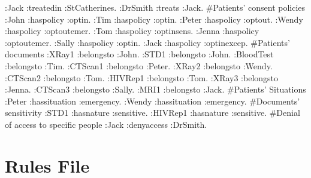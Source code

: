 \documentclass[conference]{IEEEtran}
\begin{document}
:Jack :treatedin :StCatherines.\newline
:DrSmith :treats :Jack.\newline
\newline
\#Patients' consent policies\newline
:John :haspolicy :optin.\newline
:Tim :haspolicy :optin.\newline
:Peter :haspolicy :optout.\newline
:Wendy :haspolicy :optoutemer.\newline
:Tom :haspolicy :optinsens.\newline
:Jenna :haspolicy :optoutemer.\newline
:Sally :haspolicy :optin.\newline
:Jack :haspolicy :optinexcep.\newline
\newline
\#Patients' documents\newline
:XRay1 :belongsto :John.\newline
:STD1 :belongsto :John.\newline
:BloodTest :belongsto :Tim.\newline
:CTScan1 :belongsto :Peter.\newline
:XRay2 :belongsto :Wendy.\newline
:CTScan2 :belongsto :Tom.\newline
:HIVRep1 :belongsto :Tom.\newline
:XRay3 :belongsto :Jenna.\newline
:CTScan3 :belongsto :Sally.\newline
:MRI1 :belongsto :Jack.\newline
\newline
\#Patients' Situations\newline
:Peter :hassituation :emergency.\newline
:Wendy :hassituation :emergency.\newline
\newline
\#Documents' sensitivity\newline
:STD1 :hasnature :sensitive.\newline
:HIVRep1 :hasnature :sensitive.\newline
 \newline
\#Denial of access to specific people\newline
:Jack :denyaccess :DrSmith.\newline

\section{Rules File}
\label{sec:rules-file}
\end{document}
